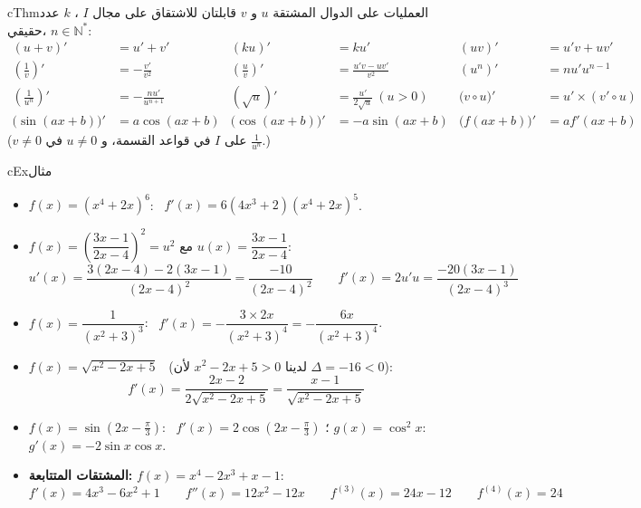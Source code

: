\documentclass[12pt,a4paper]{article}
\newenvironment{BOX}[2]{\begin{otherlanguage}{english}\begin{arbox}{#1}{#2}}{\end{arbox}\end{otherlanguage}}
\newenvironment{khassia}[1][خاصية]{\begin{BOX}{cThm}{#1}}{\end{BOX}}
\newenvironment{mithal}[1][مثال]{\begin{BOX}{cEx}{#1}}{\end{BOX}}
\newcommand{\N}{\mathbb{N}}
\begin{document}
\begin{khassia}[العمليات على الدوال المشتقة]
$u$ و $v$ قابلتان للاشتقاق على مجال $I$ ، $k$ عدد حقيقي، $n\in\N^{*}$:
\begin{align*}
(u+v)'&=u'+v' & (ku)'&=ku' & (uv)'&=u'v+uv'\\
\left(\frac1v\right)'&=-\frac{v'}{v^{2}} & \left(\frac uv\right)'&=\frac{u'v-uv'}{v^{2}} & \left(u^{n}\right)'&=nu'u^{n-1}\\
\left(\frac{1}{u^{n}}\right)'&=-\frac{nu'}{u^{n+1}} & \left(\sqrt{u}\right)'&=\frac{u'}{2\sqrt{u}}\ (u>0) & \big(v\circ u\big)'&=u'\times\left(v'\circ u\right)\\
\big(\sin(ax+b)\big)'&=a\cos(ax+b) & \big(\cos(ax+b)\big)'&=-a\sin(ax+b) & \big(f(ax+b)\big)'&=af'(ax+b)
\end{align*}
($v\ne0$ على $I$ في قواعد القسمة، و $u\neq0$ في $\frac{1}{u^{n}}$.)
\end{khassia}

\begin{mithal}
\begin{itemize}
\item $f(x)=\left(x^{4}+2x\right)^{6}$: \ $f'(x)=6\left(4x^{3}+2\right)\left(x^{4}+2x\right)^{5}$.
\item $f(x)=\left(\dfrac{3x-1}{2x-4}\right)^{2}=u^{2}$ مع $u(x)=\dfrac{3x-1}{2x-4}$:
\[ u'(x)=\frac{3(2x-4)-2(3x-1)}{(2x-4)^{2}}=\frac{-10}{(2x-4)^{2}}\qquad f'(x)=2u'u=\frac{-20(3x-1)}{(2x-4)^{3}} \]
\item $f(x)=\dfrac{1}{\left(x^{2}+3\right)^{3}}$: \ $f'(x)=-\dfrac{3\times2x}{\left(x^{2}+3\right)^{4}}=-\dfrac{6x}{\left(x^{2}+3\right)^{4}}$.
\item $f(x)=\sqrt{x^{2}-2x+5}$ \ (لدينا $x^{2}-2x+5>0$ لأن $\Delta=-16<0$):
\[ f'(x)=\frac{2x-2}{2\sqrt{x^{2}-2x+5}}=\frac{x-1}{\sqrt{x^{2}-2x+5}} \]
\item $f(x)=\sin\left(2x-\frac{\pi}{3}\right)$: \ $f'(x)=2\cos\left(2x-\frac{\pi}{3}\right)$ ؛ \quad $g(x)=\cos^{2}x$: \ $g'(x)=-2\sin x\cos x$.
\item \textbf{المشتقات المتتابعة:} $f(x)=x^{4}-2x^{3}+x-1$:
\[ f'(x)=4x^{3}-6x^{2}+1\qquad f''(x)=12x^{2}-12x\qquad f^{(3)}(x)=24x-12\qquad f^{(4)}(x)=24 \]
\end{itemize}
\end{mithal}
\end{document}
